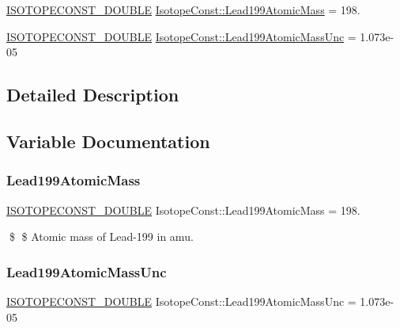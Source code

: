 \begin{DoxyCompactItemize}
\item 
\mbox{\hyperlink{group___isotope_const-_macros_ga8f45a7272ce02c0b4c65c44636ed719a}{I\+S\+O\+T\+O\+P\+E\+C\+O\+N\+S\+T\+\_\+\+D\+O\+U\+B\+LE}} \mbox{\hyperlink{group___isotope_const-_lead-_pb199_ga377dbd3b4f365ea25dad8164993ba173}{Isotope\+Const\+::\+Lead199\+Atomic\+Mass}} = 198.
\item 
\mbox{\hyperlink{group___isotope_const-_macros_ga8f45a7272ce02c0b4c65c44636ed719a}{I\+S\+O\+T\+O\+P\+E\+C\+O\+N\+S\+T\+\_\+\+D\+O\+U\+B\+LE}} \mbox{\hyperlink{group___isotope_const-_lead-_pb199_ga5f46422844e70d40bb289cbaef2cc4a7}{Isotope\+Const\+::\+Lead199\+Atomic\+Mass\+Unc}} = 1.\+073e-\/05
\end{DoxyCompactItemize}


\subsection{Detailed Description}


\subsection{Variable Documentation}
\mbox{\label{group___isotope_const-_lead-_pb199_ga377dbd3b4f365ea25dad8164993ba173}} 
\subsubsection{\texorpdfstring{Lead199\+Atomic\+Mass}{Lead199AtomicMass}}
{\footnotesize\ttfamily \mbox{\hyperlink{group___isotope_const-_macros_ga8f45a7272ce02c0b4c65c44636ed719a}{I\+S\+O\+T\+O\+P\+E\+C\+O\+N\+S\+T\+\_\+\+D\+O\+U\+B\+LE}} Isotope\+Const\+::\+Lead199\+Atomic\+Mass = 198.}

\$ \$ Atomic mass of Lead-\/199 in amu. \mbox{\label{group___isotope_const-_lead-_pb199_ga5f46422844e70d40bb289cbaef2cc4a7}} 
\subsubsection{\texorpdfstring{Lead199\+Atomic\+Mass\+Unc}{Lead199AtomicMassUnc}}
{\footnotesize\ttfamily \mbox{\hyperlink{group___isotope_const-_macros_ga8f45a7272ce02c0b4c65c44636ed719a}{I\+S\+O\+T\+O\+P\+E\+C\+O\+N\+S\+T\+\_\+\+D\+O\+U\+B\+LE}} Isotope\+Const\+::\+Lead199\+Atomic\+Mass\+Unc = 1.\+073e-\/05}

